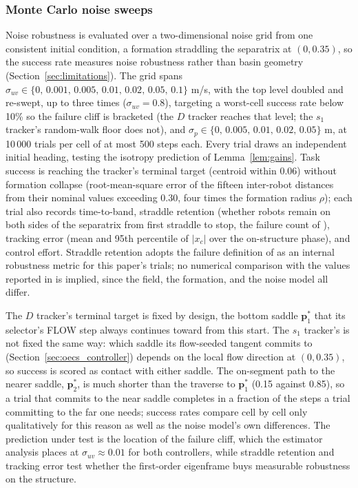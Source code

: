 \documentclass[lettersize,journal]{IEEEtran}
\begin{document}
\subsubsection{Monte Carlo noise sweeps}
Noise robustness is evaluated over a two-dimensional noise grid from
one consistent initial condition, a formation straddling the separatrix
at $(0, 0.35)$, so the success rate measures noise robustness rather
than basin geometry (Section~\ref{sec:limitations}). The grid spans $\sigma_{uv} \in \{0,\,
0.001,\, 0.005,\, 0.01,\, 0.02,\, 0.05,\, 0.1\}$ m/s, with the top
level doubled and re-swept, up to three times ($\sigma_{uv} = 0.8$),
targeting a worst-cell success rate below 10\% so the failure cliff is
bracketed (the $D$ tracker reaches that level; the $s_1$ tracker's
random-walk floor does not), and $\sigma_p \in
\{0,\, 0.005,\, 0.01,\, 0.02,\, 0.05\}$ m, at 10\,000 trials per cell of
at most 500 steps each. Every trial draws an independent initial
heading, testing the isotropy prediction of Lemma~\ref{lem:gains}.
Task success is reaching the tracker's terminal target (centroid
within 0.06) without formation collapse (root-mean-square error of the
fifteen inter-robot distances from their nominal values exceeding
0.30, four times the formation radius $\rho$); each trial also
records time-to-band, straddle retention (whether robots remain on
both sides of the separatrix from first straddle to stop, the failure
count of \cite{9}), tracking error (mean and 95th percentile of
$|x_c|$ over the on-structure phase), and control effort. Straddle
retention adopts the failure definition of \cite{9} as an internal
robustness metric for this paper's trials; no numerical comparison
with the values reported in \cite{9} is implied, since the field, the
formation, and the noise model all differ.

The $D$ tracker's terminal target is fixed by design, the bottom saddle
$\mathbf{p}^*_1$ that its selector's FLOW step always continues toward
from this start. The $s_1$ tracker's is not fixed the same way: which
saddle its flow-seeded tangent commits to
(Section~\ref{sec:oecs_controller}) depends on the local flow direction
at $(0, 0.35)$, so success is scored as contact with either saddle. The
on-segment path to the nearer saddle, $\mathbf{p}^*_2$, is much shorter
than the traverse to $\mathbf{p}^*_1$ (0.15 against 0.85), so a trial
that commits to the near saddle completes in a fraction of the steps a
trial committing to the far one needs; success rates compare cell by
cell only qualitatively for this reason as well as the noise model's own
differences. The prediction under test is the location of the failure
cliff, which the estimator analysis places at $\sigma_{uv} \approx 0.01$
for both controllers, while straddle retention and tracking error test
whether the first-order eigenframe buys measurable robustness on the
structure.
\end{document}
